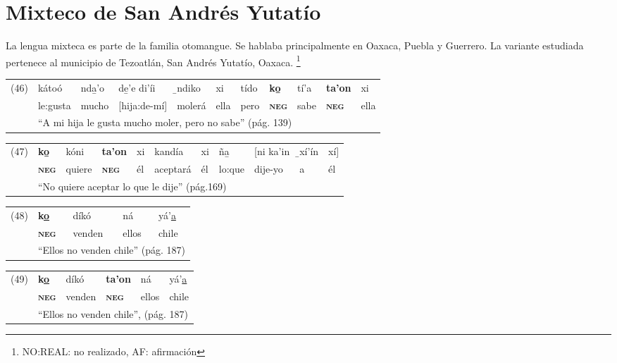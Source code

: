 \section*{Mixteco de San Andrés Yutatío}

\noindent La lengua mixteca es parte de la familia otomangue. Se hablaba principalmente en Oaxaca, Puebla y Guerrero. La variante estudiada pertenece al municipio de Tezoatlán, San Andrés Yutatío, Oaxaca.
\footnote{NO:REAL: no realizado, AF: afirmación}
\vspace{0.2cm}

{\setmainfont{Charis SIL} 

\noindent \begin{tabular}{lllllllllll}
(46) & kátoó & nda̱'o & de̱'e di'íi & ̱ndiko & xi & tído & \textbf{ko̱} & tí'a & \textbf{ta'on} & xi \\
& le:gusta & mucho & [hija:de-mí] & molerá & ella & pero & \textsc{\textbf{neg}} & sabe & \textsc{\textbf{neg}} & ella \\
& \multicolumn{10}{l}{``A mi hija le gusta mucho moler, pero no sabe'' (pág. 139)}
\end{tabular} \vspace{0.2cm}

\noindent \begin{tabular}{lllllllllll}
(47) & \textbf{ko̱} & kóni & \textbf{ta'on} & xi & kandía & xi & ña̱ & [ni ka'in & ̱xí'ín & xí] \\
& \textsc{\textbf{neg}} & quiere & \textsc{\textbf{neg}} & él & aceptará & él & lo:que & dije-yo & a & él \\
& \multicolumn{10}{l}{``No quiere aceptar lo que le dije'' (pág.169)}
\end{tabular} \vspace{0.2cm}

\noindent \begin{tabular}{lllll}
(48) & \textbf{k\underline{o}} & díkó & ná & yá'\underline{a} \\
& \textsc{\textbf{neg}} & venden & ellos & chile \\
& \multicolumn{4}{l}{``Ellos no venden chile'' (pág. 187)}
\end{tabular} \vspace{0.2cm}

\noindent \begin{tabular}{llllll}
(49) &  \textbf{k\underline{o}} & díkó & \textbf{ta'on} & ná & yá'\underline{a} \\
& \textsc{\textbf{neg}} & venden & \textsc{\textbf{neg}} & ellos & chile \\
& \multicolumn{5}{l}{``Ellos no venden chile'', (pág. 187)}
\end{tabular} \vspace{0.2cm}

}
